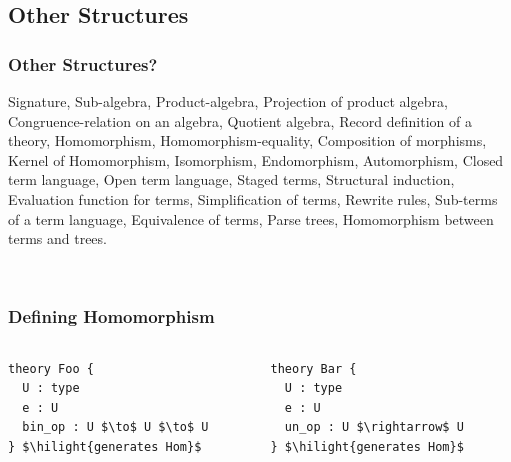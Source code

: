 \documentclass[t,12pt,numbers,fleqn,usenames,xcolor=dvipsnames]{beamer}
\newcommand{\hilight}[1]{\colorbox{yellow}{#1}}
\begin{document}

\subsection{Other Structures}
\begin{frame}
\frametitle{Other Structures?}
\vspace{0.15cm}
{\scriptsize
	Signature, Sub-algebra, Product-algebra, Projection of product algebra, Congruence-relation on 
	an algebra, Quotient algebra, Record definition of a theory, Homomorphism, 
	Homomorphism-equality, Composition of morphisms, Kernel of Homomorphism, Isomorphism, 
	Endomorphism, Automorphism, Closed term language, Open term language, Staged terms, 
	Structural induction, Evaluation function for terms, Simplification of terms, Rewrite rules, 
	Sub-terms of a term language, Equivalence of terms, Parse trees, Homomorphism between 
	terms and trees. 
}

\vspace{0.3cm}
\pause
{}
\
\end{frame}

\begin{frame}[fragile]
\frametitle{Defining Homomorphism}
\begin{columns}
	\scriptsize
	\begin{column}{0.45\textwidth}
		\begin{lstlisting}
theory Foo { 
  U : type 
  e : U 
  bin_op : U $\to$ U $\to$ U
} $\hilight{generates Hom}$
		\end{lstlisting}
	\end{column}
	\begin{column}{0.45\textwidth}
		\begin{lstlisting}
theory Bar {
  U : type 
  e : U 
  un_op : U $\rightarrow$ U 
} $\hilight{generates Hom}$
		\end{lstlisting}
	\end{column}
\end{columns}
\end{frame}
\end{document}

